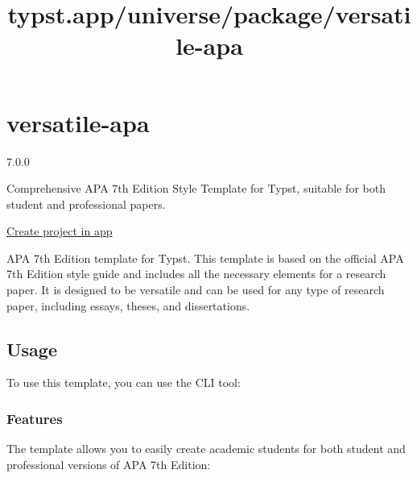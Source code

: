 \title{typst.app/universe/package/versatile-apa}

\label{banner}
\label{template-thumbnail}

\section{versatile-apa}\label{versatile-apa}

{ 7.0.0 }

Comprehensive APA 7th Edition Style Template for Typst, suitable for
both student and professional papers.

\href{/app?template=versatile-apa&version=7.0.0}{Create project in app}

\label{readme}
APA 7th Edition template for Typst. This template is based on the
official APA 7th Edition style guide and includes all the necessary
elements for a research paper. It is designed to be versatile and can be
used for any type of research paper, including essays, theses, and
dissertations.

\subsection{Usage}\label{usage}

To use this template, you can use the CLI tool:

\begin{Shaded}
\begin{Highlighting}[]
\end{Highlighting}
\end{Shaded}

\subsubsection{Features}\label{features}

The template allows you to easily create academic students for both
student and professional versions of APA 7th Edition:

